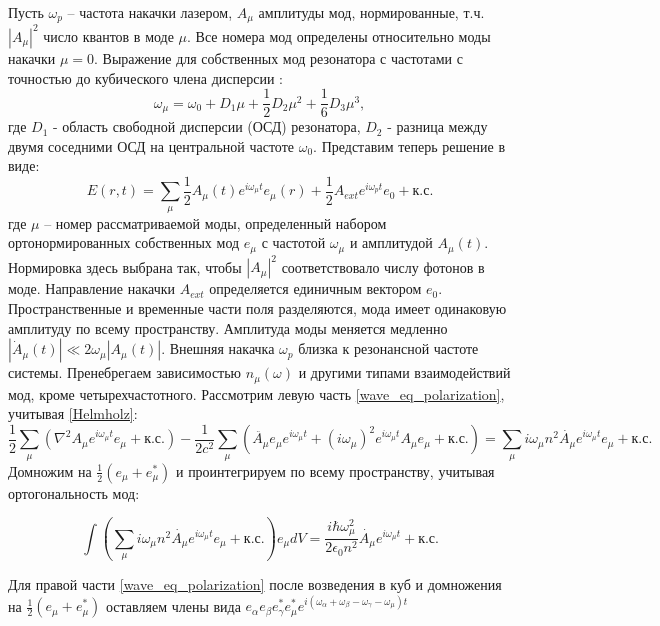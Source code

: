Пусть $\omega_p$ -- частота накачки лазером, $A_\mu$ амплитуды мод, нормированные, т.ч. $|A_\mu|^2$ число квантов в моде $\mu$. Все номера мод определены относительно моды накачки $\mu=0$. Выражение для собственных мод резонатора с частотами с точностью до кубического члена дисперсии \cite{MLG_nature_2012}:
\begin{equation}\label{dispersion_eq}
\omega_\mu=\omega_0+D_1\mu+\frac{1}{2}D_2\mu^2+\frac{1}{6}D_3\mu^3,
\end{equation}
где $D_1$ - область свободной дисперсии (ОСД) резонатора, $D_2$ - разница между двумя соседними ОСД на центральной частоте $\omega_0$. Представим теперь решение в виде:
\begin{equation}\label{SMA_E}
E(r,t)=\sum_\mu\frac{1}{2}A_\mu(t)e^{i\omega_\mu t}e_\mu(r)+\frac{1}{2}A_{ext}e^{i\omega_pt}e_0+\text{к.с.}
\end{equation}
где $\mu$ -- номер рассматриваемой моды, определенный набором ортонормированных собственных мод $e_\mu$ с частотой $\omega_\mu$ и амплитудой $A_\mu(t)$. Нормировка здесь выбрана так, чтобы $|A_\mu|^2$ соответствовало числу фотонов в моде. Направление накачки $A_{ext}$ определяется единичным вектором $e_0$. Пространственные и временные части поля разделяются, мода имеет одинаковую амплитуду по всему пространству. Амплитуда моды меняется медленно $|\dot{A}_\mu(t)|\ll2\omega_\mu|A_\mu(t)|$. Внешняя накачка $\omega_p$ близка к резонансной частоте системы. Пренебрегаем зависимостью $n_\mu(\omega)$ и другими типами взаимодействий мод, кроме четырехчастотного. Рассмотрим левую часть \eqref{wave_eq_polarization}, учитывая \eqref{Helmholz}:
%
\begin{equation}
\frac{1}{2}\sum_\mu(\nabla^2A_\mu e^{i\omega_\mu t}e_\mu+\text{к.с.})-\frac{1}{2c^2}\sum_\mu(\ddot{A_\mu}e_\mu e^{i\omega_\mu t}+(i\omega_\mu)^2e^{i\omega_\mu t}A_\mu e_\mu+\text{к.с.})=\sum_\mu i\omega_\mu n^2 \dot{A_\mu}e^{i\omega_\mu t}e_\mu+\text{к.с.}
\end{equation}
%
Домножим на $\frac{1}{2}(e_\mu+e_\mu^*)$ и проинтегрируем по всему пространству, учитывая ортогональность мод:

\begin{equation}
\int(\sum_\mu i\omega_\mu n^2 \dot{A_\mu}e^{i\omega_\mu t}e_\mu+\text{к.с.})e_\mu dV=\frac{i\hbar\omega_\mu^2}{2\epsilon_0n^2}\dot{A_\mu}e^{i\omega_\mu t}+\text{к.с.}
\end{equation}

Для правой части \eqref{wave_eq_polarization} после возведения в куб и домножения на $\frac{1}{2}(e_\mu+e_\mu^*)$ оставляем члены вида $e_\alpha e_\beta e_\gamma^* e_\mu^* e^{i(\omega_\alpha+\omega_\beta-\omega_\gamma-\omega_\mu)t}$

